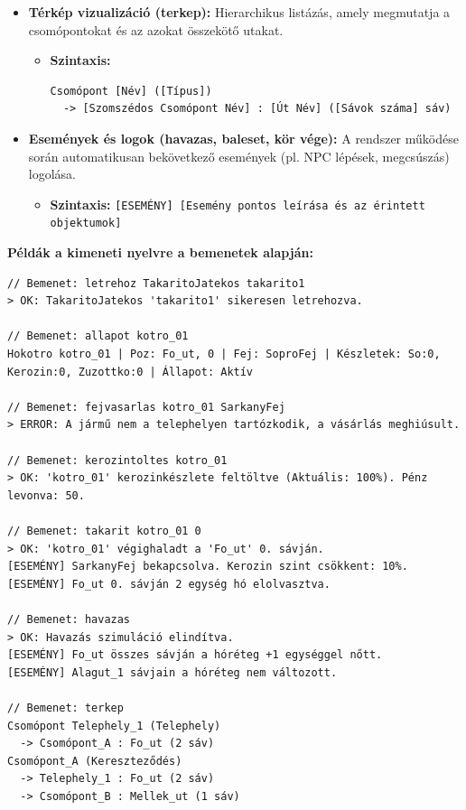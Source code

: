 \begin{itemize}
    \item \textbf{Térkép vizualizáció (terkep):} Hierarchikus listázás, amely megmutatja a csomópontokat és az azokat összekötő utakat.
    \begin{itemize}
        \item \textbf{Szintaxis:} 
        \begin{verbatim}
Csomópont [Név] ([Típus])
  -> [Szomszédos Csomópont Név] : [Út Név] ([Sávok száma] sáv)
        \end{verbatim}
    \end{itemize}

    \item \textbf{Események és logok (havazas, baleset, kör vége):} A rendszer működése során automatikusan bekövetkező események (pl. NPC lépések, megcsúszás) logolása.
    \begin{itemize}
        \item \textbf{Szintaxis:} \texttt{[ESEMÉNY] [Esemény pontos leírása és az érintett objektumok]}
    \end{itemize}
\end{itemize}

\textbf{Példák a kimeneti nyelvre a bemenetek alapján:}

\begin{verbatim}
// Bemenet: letrehoz TakaritoJatekos takarito1
> OK: TakaritoJatekos 'takarito1' sikeresen letrehozva.

// Bemenet: allapot kotro_01
Hokotro kotro_01 | Poz: Fo_ut, 0 | Fej: SoproFej | Készletek: So:0, Kerozin:0, Zuzottko:0 | Állapot: Aktív

// Bemenet: fejvasarlas kotro_01 SarkanyFej
> ERROR: A jármű nem a telephelyen tartózkodik, a vásárlás meghiúsult.

// Bemenet: kerozintoltes kotro_01
> OK: 'kotro_01' kerozinkészlete feltöltve (Aktuális: 100%). Pénz levonva: 50.

// Bemenet: takarit kotro_01 0
> OK: 'kotro_01' végighaladt a 'Fo_ut' 0. sávján.
[ESEMÉNY] SarkanyFej bekapcsolva. Kerozin szint csökkent: 10%.
[ESEMÉNY] Fo_ut 0. sávján 2 egység hó elolvasztva.

// Bemenet: havazas
> OK: Havazás szimuláció elindítva.
[ESEMÉNY] Fo_ut összes sávján a hóréteg +1 egységgel nőtt.
[ESEMÉNY] Alagut_1 sávjain a hóréteg nem változott.

// Bemenet: terkep
Csomópont Telephely_1 (Telephely)
  -> Csomópont_A : Fo_ut (2 sáv)
Csomópont_A (Kereszteződés)
  -> Telephely_1 : Fo_ut (2 sáv)
  -> Csomópont_B : Mellek_ut (1 sáv)
\end{verbatim}

